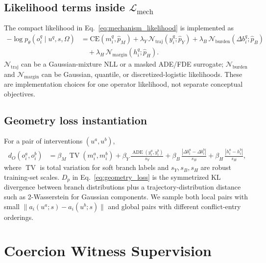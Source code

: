 \documentclass[10pt]{article}
\begin{document}
\subsection{Likelihood terms inside \texorpdfstring{\(\mathcal L_{\mathrm{mech}}\)}{Lmech}}

The compact likelihood in Eq.~\eqref{eq:mechanism_likelihood} is implemented as
\begin{equation}
\begin{aligned}
    -\log p_\theta(o_i^q\mid u^q,s,\Omega)
    &=
    \mathrm{CE}(m_i^q,\hat p_M)
    +
    \lambda_Y\,\mathcal N_{\mathrm{traj}}(y_i^q;\hat p_Y)
    +
    \lambda_B\,\mathcal N_{\mathrm{burden}}(\Delta b_i^q;\hat p_B)\\
    &\quad+
    \lambda_H\,\mathcal N_{\mathrm{margin}}(h_i^q;\hat p_H).
\end{aligned}
\label{eq:appendix_likelihood}
\end{equation}
\(\mathcal N_{\mathrm{traj}}\) can be a Gaussian-mixture NLL or a masked ADE/FDE surrogate; \(\mathcal N_{\mathrm{burden}}\) and \(\mathcal N_{\mathrm{margin}}\) can be Gaussian, quantile, or discretized-logistic likelihoods. These are implementation choices for one operator likelihood, not separate conceptual objectives.

\subsection{Geometry loss instantiation}

For a pair of interventions \((u^a,u^b)\),
\begin{equation}
\begin{aligned}
    d_O(o_i^a,o_i^b)
    &=
    \beta_M\,\operatorname{TV}(m_i^a,m_i^b)
    +
    \beta_Y\,\frac{\operatorname{ADE}(y_i^a,y_i^b)}{s_Y}
    +
    \beta_B\,\frac{|\Delta b_i^a-\Delta b_i^b|}{s_B}
    +
    \beta_H\,\frac{|h_i^a-h_i^b|}{s_H},
\end{aligned}
\label{eq:appendix_response_metric}
\end{equation}
where \(\operatorname{TV}\) is total variation for soft branch labels and \(s_Y,s_B,s_H\) are robust training-set scales. \(D_p\) in Eq.~\eqref{eq:geometry_loss} is the symmetrized KL divergence between branch distributions plus a trajectory-distribution distance such as 2-Wasserstein for Gaussian components. We sample both local pairs with small \(\|a_i(u^a;s)-a_i(u^b;s)\|\) and global pairs with different conflict-entry orderings.

\section{Coercion Witness Supervision}
\label{app:cw_supervision}
\end{document}
